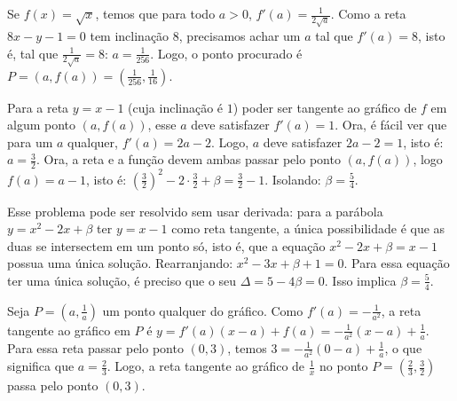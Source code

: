 \begin{Solution}{6.6}
Se $f(x)=\sqrt{x}$, temos que para todo $a>0$,
$f'(a)=\frac{1}{2\sqrt{a}}$.
Como a reta $8x-y- 1 = 0$ tem inclinação $8$, precisamos achar um $a$ tal que
$f'(a)=8$, isto é, tal que $\frac{1}{2\sqrt{a}}=8$: $a=\frac{1}{256}$.
Logo, o ponto procurado é $P=(a,f(a))=(\frac{1}{256},\frac{1}{16})$.
\end{Solution}
\begin{Solution}{6.7}
Para a reta $y=x-1$ (cuja inclinação é $1$) poder ser tangente ao gráfico de
$f$ em algum ponto $(a,f(a))$, esse $a$ deve satisfazer $f'(a)=1$. Ora, é fácil
ver que para um $a$ qualquer, $f'(a)=2a-2$. Logo, $a$ deve satisfazer $2a-2=1$,
isto é: $a=\frac32$. Ora, a reta e a função devem ambas passar pelo ponto
$(a,f(a))$, logo $f(a)=a-1$, isto é:
$(\frac32)^2-2\cdot\frac32+\beta=\frac32-1$. Isolando:
$\beta=\frac{5}{4}$.
\begin{center}
\begin{bmlimage}\end{bmlimage}
\end{center}
Esse problema pode ser resolvido sem usar derivada:
para a parábola $y=x^2-2x+\beta$ ter $y=x-1$ como reta tangente, a única
possibilidade é que as duas se intersectem em um ponto só, isto é, que a
equação $x^2-2x+\beta=x-1$ possua uma única solução. Rearranjando:
$x^2-3x+\beta+1=0$. Para essa equação ter uma única solução, é preciso que o
seu $\Delta=5-4\beta=0$. Isso implica $\beta=\frac{5}{4}$.
\end{Solution}
\begin{Solution}{6.8}
Seja $P=(a,\frac1a)$ um ponto qualquer do gráfico. Como
$f'(a)=-\frac{1}{a^2}$, a reta tangente ao gráfico em $P$ é
$y=f'(a)(x-a)+f(a)=-\frac{1}{a^2}(x-a)+\frac1a$. Para essa reta passar pelo
ponto $(0,3)$, temos $3=-\frac{1}{a^2}(0-a)+\frac1a$, o que
significa que $a=\frac{2}{3}$.
Logo, a reta tangente ao gráfico de $\frac1x$ no ponto $P=(\frac23,\frac32)$
passa pelo ponto $(0,3)$.
\end{Solution}
